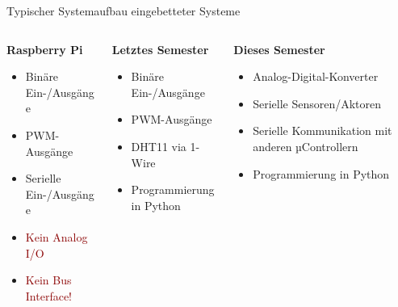 {\begin{frame}{Typischer Systemaufbau eingebetteter Systeme}
    \begin{columns}
        \begin{column}[T]{.3\textwidth}
            \textbf{Raspberry Pi}
            \begin{itemize}
                \item Binäre Ein-/Ausgänge
                \item PWM-Ausgänge
                \item Serielle Ein-/Ausgänge
                \item<2> \textcolor{darkred}{Kein Analog I/O}
                \item<2> \textcolor{darkred}{Kein Bus Interface!}
            \end{itemize}
        \end{column}
        \begin{column}[T]{.3\textwidth}
            \textbf{Letztes Semester}
            \begin{itemize}
                \item Binäre Ein-/Ausgänge
                \item PWM-Ausgänge
                \item DHT11 via 1-Wire
                \item Programmierung in Python
            \end{itemize}
        \end{column}
        \begin{column}[T]{.3\textwidth}
            \textbf{Dieses Semester}
            \begin{itemize}
                \item Analog-Digital-Konverter
                \item Serielle Sensoren/Aktoren
                \item Serielle Kommunikation mit anderen µControllern
                \item Programmierung in Python
            \end{itemize}
        \end{column}
    \end{columns}
\end{frame}
}

